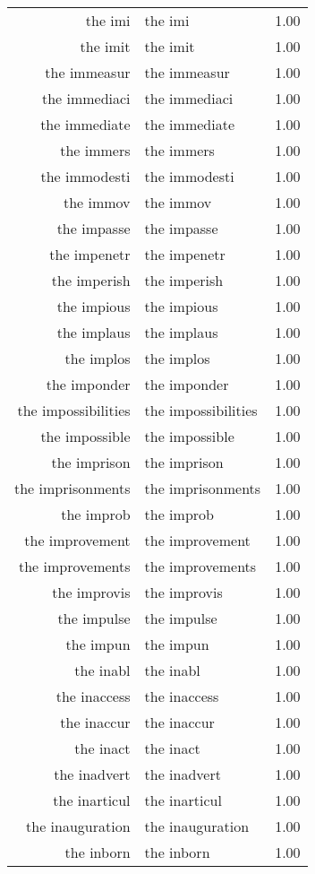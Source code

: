 \begin{table}[ht]
\begin{tabular}{rlr}
  the imi & the imi & 1.00 \\ 
  the imit & the imit & 1.00 \\ 
  the immeasur & the immeasur & 1.00 \\ 
  the immediaci & the immediaci & 1.00 \\ 
  the immediate & the immediate & 1.00 \\ 
  the immers & the immers & 1.00 \\ 
  the immodesti & the immodesti & 1.00 \\ 
  the immov & the immov & 1.00 \\ 
  the impasse & the impasse & 1.00 \\ 
  the impenetr & the impenetr & 1.00 \\ 
  the imperish & the imperish & 1.00 \\ 
  the impious & the impious & 1.00 \\ 
  the implaus & the implaus & 1.00 \\ 
  the implos & the implos & 1.00 \\ 
  the imponder & the imponder & 1.00 \\ 
  the impossibilities & the impossibilities & 1.00 \\ 
  the impossible & the impossible & 1.00 \\ 
  the imprison & the imprison & 1.00 \\ 
  the imprisonments & the imprisonments & 1.00 \\ 
  the improb & the improb & 1.00 \\ 
  the improvement & the improvement & 1.00 \\ 
  the improvements & the improvements & 1.00 \\ 
  the improvis & the improvis & 1.00 \\ 
  the impulse & the impulse & 1.00 \\ 
  the impun & the impun & 1.00 \\ 
  the inabl & the inabl & 1.00 \\ 
  the inaccess & the inaccess & 1.00 \\ 
  the inaccur & the inaccur & 1.00 \\ 
  the inact & the inact & 1.00 \\ 
  the inadvert & the inadvert & 1.00 \\ 
  the inarticul & the inarticul & 1.00 \\ 
  the inauguration & the inauguration & 1.00 \\ 
  the inborn & the inborn & 1.00 \\ 

\end{tabular}
\end{table}
